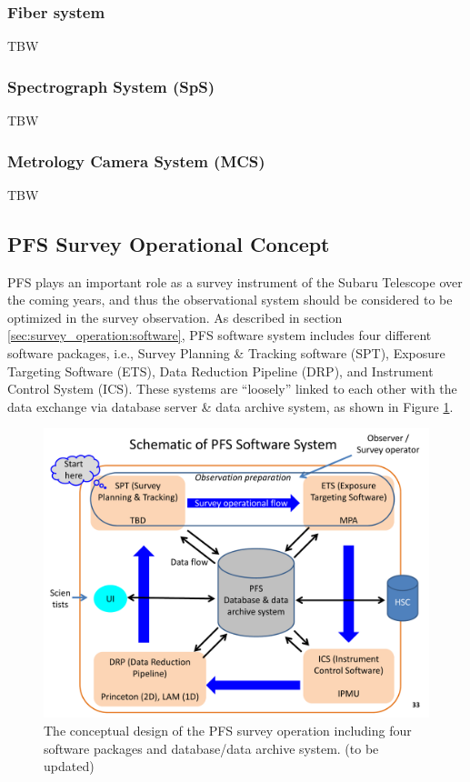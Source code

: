 \documentclass[a4paper]{article}
\begin{document}
\subsubsection{Fiber system\label{sec:pfs_system:fib}}
TBW
\subsubsection{Spectrograph System (SpS)\label{sec:pfs_system:sps}}
TBW
\subsubsection{Metrology Camera System (MCS)\label{sec:pfs_system:mcs}}
TBW

\subsection{PFS Survey Operational Concept}
PFS plays an important role as a survey instrument of the Subaru Telescope over the coming years, and thus the observational system should be considered to be optimized in the survey observation. As described in section \ref{sec:survey_operation:software}, PFS software system includes four different software packages, i.e., Survey Planning  \& Tracking software (SPT), Exposure Targeting Software (ETS), Data Reduction Pipeline (DRP), and Instrument Control System (ICS). These systems are ``loosely'' linked to each other with the data exchange via database server \& data archive system, as shown in Figure \ref{fig:pfs_survey_concept}.

\begin{figure}[!htb]
\begin{center}
\includegraphics[scale=0.5]{./figures/pfs_survey_operational_concept.pdf}
\end{center}
\caption{The conceptual design of the PFS survey operation including four software packages and database/data archive system. (to be updated)\label{fig:pfs_survey_concept}}
\end{figure}
\end{document}
